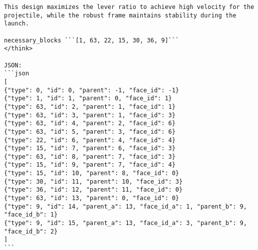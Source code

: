 \begin{lstlisting}
This design maximizes the lever ratio to achieve high velocity for the projectile, while the robust frame maintains stability during the launch.

necessary_blocks ```[1, 63, 22, 15, 30, 36, 9]```
</think>

JSON:
```json
[
{"type": 0, "id": 0, "parent": -1, "face_id": -1}
{"type": 1, "id": 1, "parent": 0, "face_id": 1}
{"type": 63, "id": 2, "parent": 1, "face_id": 1}
{"type": 63, "id": 3, "parent": 1, "face_id": 3}
{"type": 63, "id": 4, "parent": 2, "face_id": 6}
{"type": 63, "id": 5, "parent": 3, "face_id": 6}
{"type": 22, "id": 6, "parent": 4, "face_id": 4}
{"type": 15, "id": 7, "parent": 6, "face_id": 3}
{"type": 63, "id": 8, "parent": 7, "face_id": 3}
{"type": 15, "id": 9, "parent": 7, "face_id": 4}
{"type": 15, "id": 10, "parent": 8, "face_id": 0}
{"type": 30, "id": 11, "parent": 10, "face_id": 3}
{"type": 36, "id": 12, "parent": 11, "face_id": 0}
{"type": 63, "id": 13, "parent": 0, "face_id": 0}
{"type": 9, "id": 14, "parent_a": 13, "face_id_a": 1, "parent_b": 9, "face_id_b": 1}
{"type": 9, "id": 15, "parent_a": 13, "face_id_a": 3, "parent_b": 9, "face_id_b": 2}
]
```
\end{lstlisting}

